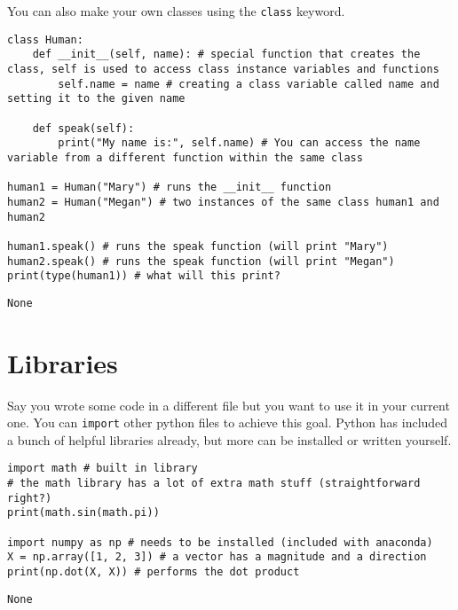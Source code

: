 \documentclass{assignments}
\begin{document}
You can also make your own classes using the \texttt{class} keyword.
\begin{verbatim}
class Human:
    def __init__(self, name): # special function that creates the class, self is used to access class instance variables and functions
        self.name = name # creating a class variable called name and setting it to the given name

    def speak(self):
        print("My name is:", self.name) # You can access the name variable from a different function within the same class

human1 = Human("Mary") # runs the __init__ function
human2 = Human("Megan") # two instances of the same class human1 and human2

human1.speak() # runs the speak function (will print "Mary")
human2.speak() # runs the speak function (will print "Megan")
print(type(human1)) # what will this print?
\end{verbatim}

\begin{verbatim}
None
\end{verbatim}

\section*{Libraries}
\label{sec:org2e2cce8}
Say you wrote some code in a different file but you want to use it in your
current one. You can \texttt{import} other python files to achieve this goal. Python has
included a bunch of helpful libraries already, but more can be installed or
written yourself.
\begin{verbatim}
import math # built in library
# the math library has a lot of extra math stuff (straightforward right?)
print(math.sin(math.pi))

import numpy as np # needs to be installed (included with anaconda)
X = np.array([1, 2, 3]) # a vector has a magnitude and a direction
print(np.dot(X, X)) # performs the dot product
\end{verbatim}

\begin{verbatim}
None
\end{verbatim}
\end{document}

